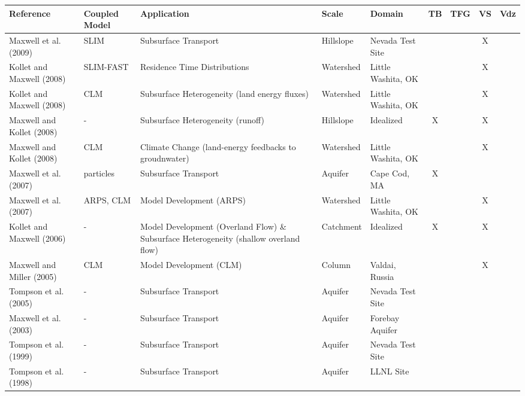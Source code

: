 {\begin{table}
\begin{tabular}{ l  p{1.5cm} p{2cm} p{1.5cm} p{1.5cm} | c | c | c | c }
\bf{Reference} & \bf{Coupled Model} & \bf{Application} & \bf{Scale} & \bf{Domain} & \bf{TB} & \bf{TFG} & \bf{VS} & \bf{Vdz} \\ 
\hline{}

\cite{MTK09} Maxwell et al. (2009) & SLIM & Subsurface Transport & Hillslope & Nevada Test Site &   &   & X &     \\
\cite{KM08b} Kollet and Maxwell (2008) & SLIM-FAST & Residence Time Distributions  & Watershed & Little Washita, OK &   &   & X &     \\
\cite{KM08a} Kollet and Maxwell (2008) & CLM & Subsurface Heterogeneity (land energy fluxes) & Watershed & Little Washita, OK &   &   & X &     \\
\cite{MK08b} Maxwell and Kollet (2008) & - & Subsurface Heterogeneity (runoff) & Hillslope & Idealized & X &   & X &     \\
\cite{MK08a} Maxwell and Kollet (2008) & CLM & Climate Change (land-energy feedbacks to groudnwater) & Watershed & Little Washita, OK &   &   & X &     \\
\cite{MWH07} Maxwell et al. (2007) & particles & Subsurface Transport & Aquifer & Cape Cod, MA & X &   &   &     \\
\cite{MCK07} Maxwell et al. (2007) & ARPS, CLM & Model Development (ARPS) & Watershed & Little Washita, OK &   &   & X &     \\
\cite{KM06} Kollet and Maxwell (2006) & - & Model Development (Overland Flow) \& Subsurface Heterogeneity (shallow overland flow) & Catchment & Idealized & X &   & X &     \\
\cite{MM05} Maxwell and Miller (2005) & CLM & Model Development (CLM) & Column & Valdai, Russia &   &   & X &     \\
\cite{TMCZPS05} Tompson et al. (2005) & - & Subsurface Transport & Aquifer & Nevada Test Site &   &   &   &     \\
\cite{MWT03} Maxwell et al. (2003) & - & Subsurface Transport & Aquifer & Forebay Aquifer &   &   &   &     \\
\cite{TBP99} Tompson et al. (1999) & - & Subsurface Transport & Aquifer & Nevada Test Site &   &   &   &     \\
\cite{TFSBA98} Tompson et al. (1998) & - & Subsurface Transport & Aquifer & LLNL Site &   &   &   &     \\
\end{tabular}
\label{pfref6}
\end{table}

}
